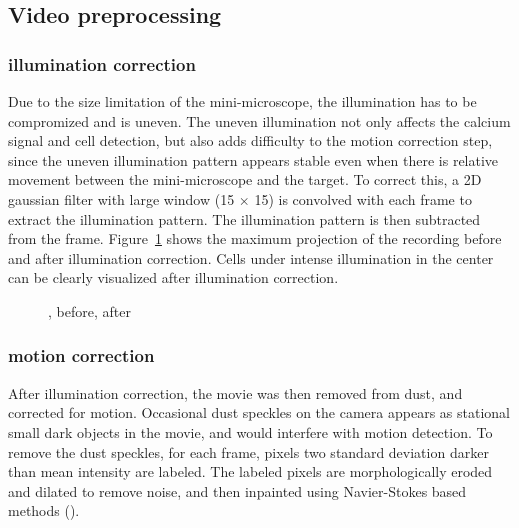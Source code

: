 \subsection{Video preprocessing}
\subsubsection{illumination correction}
Due to the size limitation of the mini-microscope, the illumination has to be compromized and is uneven. The uneven illumination not only affects the calcium signal and cell detection, but also adds difficulty to the motion correction step, since the uneven illumination pattern appears stable even when there is relative movement between the mini-microscope and the target. To correct this, a 2D gaussian filter with large window (15 $\times$ 15) is convolved with each frame to extract the illumination pattern. The illumination pattern is then subtracted from the frame. Figure~\ref{f.illumination} shows the maximum projection of the recording before and after illumination correction. Cells under intense illumination in the center can be clearly visualized after illumination correction.

\begin{figure}[h]
    \begin{subfigure}[t]{.5\textwidth}
        \centering
    \end{subfigure}
    \begin{subfigure}[t]{.5\textwidth}
        \centering
    \end{subfigure}
    \caption{\label{f.illumination}, before, after}
\end{figure}

\subsubsection{motion correction}
After illumination correction, the movie was then removed from dust, and corrected for motion. Occasional dust speckles on the camera appears as stational small dark objects in the movie, and would interfere with motion detection. To remove the dust speckles, for each frame, pixels two standard deviation darker than mean intensity are labeled. The labeled pixels are morphologically eroded and dilated to remove noise, and then inpainted using Navier-Stokes based methods ().

